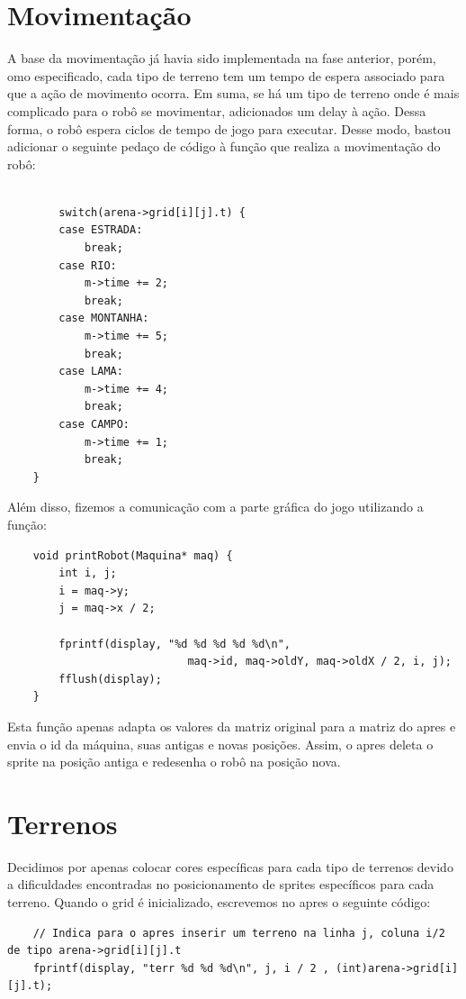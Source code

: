 \documentclass{article}
\begin{document}
    
    
    
    \section{Movimentação}
    A base da movimentação já havia sido implementada na fase anterior, porém, omo especificado, cada tipo de terreno tem um tempo de espera associado para que a ação de movimento ocorra. Em suma, se há um tipo de terreno onde é mais complicado para o robô se movimentar, adicionados um delay à ação. Dessa forma, o robô espera ciclos de tempo de jogo para executar. Desse modo, bastou adicionar o seguinte pedaço de código à função que realiza a movimentação do robô:
    
    \begin{lstlisting}
    
        switch(arena->grid[i][j].t) {
		case ESTRADA:
			break;
		case RIO:
			m->time += 2;
			break;		
		case MONTANHA:
			m->time += 5;
			break;
		case LAMA:
			m->time += 4;
			break;
		case CAMPO: 
			m->time += 1;
			break;
	}

    \end{lstlisting}
    
    Além disso, fizemos a comunicação com a parte gráfica do jogo utilizando a função:
    \begin{lstlisting}
    void printRobot(Maquina* maq) {
    	int i, j;
    	i = maq->y;
    	j = maq->x / 2;
    	
    	fprintf(display, "%d %d %d %d %d\n",
    						maq->id, maq->oldY, maq->oldX / 2, i, j);
    	fflush(display);
    }

    \end{lstlisting}
    Esta função apenas adapta os valores da matriz original para a matriz do apres e envia o id da máquina, suas antigas e novas posições. Assim, o apres deleta o sprite na posição antiga e redesenha o robô na posição nova.
    
    \section{Terrenos}
    Decidimos por apenas colocar cores específicas para cada tipo de terrenos devido a dificuldades encontradas no posicionamento de sprites específicos para cada terreno. Quando o grid é inicializado, escrevemos no apres o seguinte código:
    
    \begin{lstlisting}
    // Indica para o apres inserir um terreno na linha j, coluna i/2 de tipo arena->grid[i][j].t
    fprintf(display, "terr %d %d %d\n", j, i / 2 , (int)arena->grid[i][j].t);
    \end{lstlisting}
    
\end{document}
